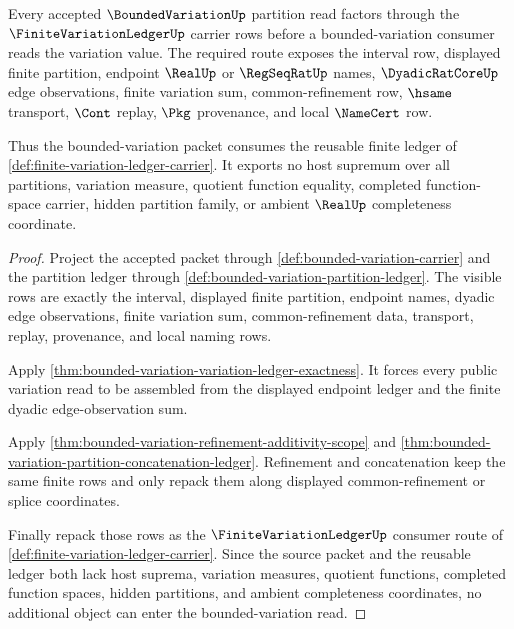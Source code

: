 \begin{theorem}
\label{thm:bounded-variation-finite-variation-ledger-consumer}
Every accepted $\BoundedVariationUp$ partition read factors through the $\FiniteVariationLedgerUp$ carrier rows before a bounded-variation consumer reads the variation value. The required route exposes the interval row, displayed finite partition, endpoint $\RealUp$ or $\RegSeqRatUp$ names, $\DyadicRatCoreUp$ edge observations, finite variation sum, common-refinement row, $\hsame$ transport, $\Cont$ replay, $\Pkg$ provenance, and local $\NameCert$ row.

Thus the bounded-variation packet consumes the reusable finite ledger of \autoref{def:finite-variation-ledger-carrier}. It exports no host supremum over all partitions, variation measure, quotient function equality, completed function-space carrier, hidden partition family, or ambient $\RealUp$ completeness coordinate.
\end{theorem}
\begin{proof}
Project the accepted packet through \autoref{def:bounded-variation-carrier} and the partition ledger through \autoref{def:bounded-variation-partition-ledger}. The visible rows are exactly the interval, displayed finite partition, endpoint names, dyadic edge observations, finite variation sum, common-refinement data, transport, replay, provenance, and local naming rows.

Apply \autoref{thm:bounded-variation-variation-ledger-exactness}. It forces every public variation read to be assembled from the displayed endpoint ledger and the finite dyadic edge-observation sum.

Apply \autoref{thm:bounded-variation-refinement-additivity-scope} and \autoref{thm:bounded-variation-partition-concatenation-ledger}. Refinement and concatenation keep the same finite rows and only repack them along displayed common-refinement or splice coordinates.

Finally repack those rows as the $\FiniteVariationLedgerUp$ consumer route of \autoref{def:finite-variation-ledger-carrier}. Since the source packet and the reusable ledger both lack host suprema, variation measures, quotient functions, completed function spaces, hidden partitions, and ambient completeness coordinates, no additional object can enter the bounded-variation read.
\end{proof}


